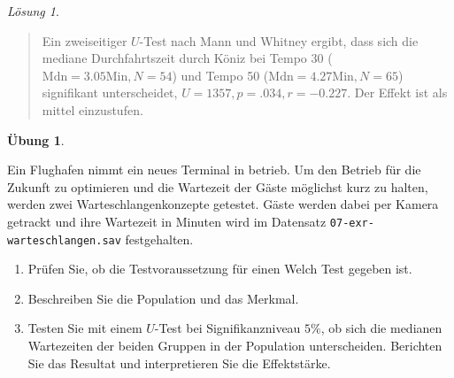 \documentclass[
]{book}
\providecommand{\tightlist}{%
  \setlength{\itemsep}{0pt}\setlength{\parskip}{0pt}}
\theoremstyle{definition}
\theoremstyle{definition}
\theoremstyle{definition}
\newtheorem{exercise}{Übung}[chapter]
\theoremstyle{definition}
\theoremstyle{remark}
\newtheorem*{solution}{Lösung}
\begin{document}
\begin{solution}
\begin{quote}
Ein zweiseitiger \(U\)-Test nach Mann und Whitney ergibt, dass sich die
mediane Durchfahrtszeit durch Köniz bei Tempo 30
(\(\text{Mdn}= 3.05 \text{Min}, N =54\)) und Tempo 50
(\(\text{Mdn}=4.27 \text{Min}, N = 65\)) signifikant unterscheidet,
\(U = 1357, p = .034, r = -0.227\). Der Effekt ist als mittel
einzustufen.
\end{quote}

\end{solution}

\begin{exercise}
\protect\hypertarget{exr:warteschlangen}{}\label{exr:warteschlangen}\leavevmode

Ein Flughafen nimmt ein neues Terminal in betrieb. Um den Betrieb für
die Zukunft zu optimieren und die Wartezeit der Gäste möglichst kurz zu
halten, werden zwei Warteschlangenkonzepte getestet. Gäste werden dabei
per Kamera getrackt und ihre Wartezeit in Minuten wird im Datensatz
\texttt{07-exr-warteschlangen.sav} festgehalten.

\begin{enumerate}
\def\labelenumi{\alph{enumi})}
\tightlist
\item
  Prüfen Sie, ob die Testvoraussetzung für einen Welch Test gegeben
  ist.
\item
  Beschreiben Sie die Population und das Merkmal.
\item
  Testen Sie mit einem \(U\)-Test bei Signifikanzniveau \(5\%\), ob sich
  die medianen Wartezeiten der beiden Gruppen in der Population
  unterscheiden. Berichten Sie das Resultat und interpretieren Sie die
  Effektstärke.
\end{enumerate}

\end{exercise}
\end{document}
